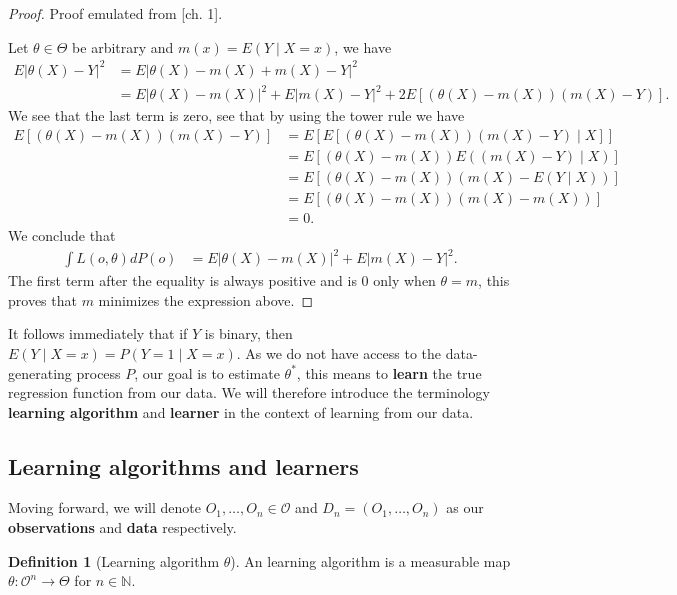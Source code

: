 \documentclass[11pt, a4paper]{article}
\theoremstyle{definition}
\newtheorem{definition}[theorem]{Definition}
\theoremstyle{remark}
\newcommand{\btheta}{\theta}
\begin{document}
\begin{proof}
    Proof emulated from \parencite{gyorfi2002distribution}[ch. 1]. 

    Let $ \btheta \in \Theta $ be arbitrary and $ m(x) = E(Y \mid X = x) $, we have 
    \begin{align*}
        E| \theta(X) - Y |^2 &= E| \theta(X) - m(X) + m(X) - Y |^2 \\
                             &= E| \theta(X) - m(X) |^2 + E| m(X) - Y |^2 + 2 E[ (\theta(X) - m(X))(m(X) - Y) ].
    \end{align*}
    We see that the last term is zero, see that by using the tower rule we have 
    \begin{align*}
        E[ (\theta(X) - m(X))(m(X) - Y) ] &= E[ E[ (\theta(X) - m(X))(m(X) - Y) \mid X] ] \\
                                                       &= E[ (\theta(X) - m(X)) E( (m(X) - Y) \mid X) ] \\
                                                       &= E[ (\theta(X) - m(X)) ( m(X) - E(Y \mid X)) ] \\
                                                       &= E[ (\theta(X) - m(X)) ( m(X) - m(X)) ] \\
                                                       &= 0.
    \end{align*}
    We conclude that 
    \begin{align*}
        \int L(o, \theta) d P(o) &= E| \theta(X) - m(X) |^2 + E | m(X) - Y |^2.
    \end{align*}
    The first term after the equality is always positive and is $ 0 $ only when $ \theta = m $, this proves that $ m $ minimizes the expression above. 
\end{proof}
It follows immediately that if $ Y $ is binary, then $ E(Y \mid X = x) = P(Y = 1 \mid X = x) $. As we do not have access to the data-generating process $ P $, our goal is to estimate $ \btheta^{*} $, this means to \textbf{learn} the true regression function from our data. 
We will therefore introduce the terminology \textbf{learning algorithm} and \textbf{learner} in the context of learning from our data.  

\subsection{Learning algorithms and learners}
Moving forward, we will denote $ O_1 , \dots , O_n \in \mathcal{O} $ and $ D_n = (O_1 , \dots , O_n) $ as our \textbf{observations} and \textbf{data} respectively. 
\begin{definition}[Learning algorithm $ \btheta $]
    An learning algorithm is a measurable map $ \btheta : \mathcal{O}^{n} \to \Theta $ for $ n \in \mathbb{N} $. 
\end{definition}
\end{document}
